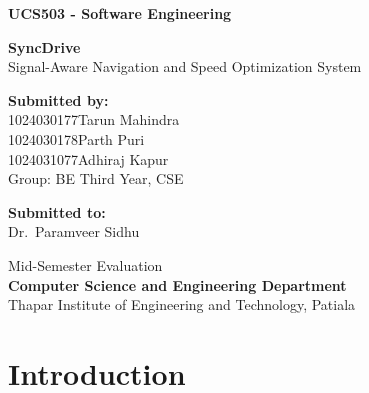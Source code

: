 \documentclass[12pt,a4paper]{report}
\begin{document}
\begin{titlepage}
\centering
\vspace*{2cm}

{\large\textbf{UCS503 - Software Engineering}}

\vspace{1.5cm}

{\Huge\textbf{SyncDrive}}\\[0.4cm]
{\large Signal-Aware Navigation and Speed Optimization System}

\vspace{3cm}

\textbf{Submitted by:}\\[0.3cm]
1024030177\quad Tarun Mahindra\\
1024030178\quad Parth Puri\\
1024031077\quad Adhiraj Kapur\\[0.4cm]
Group: BE Third Year, CSE

\vspace{2.5cm}

\textbf{Submitted to:}\\[0.3cm]
Dr.\ Paramveer Sidhu

\vspace{2.5cm}

Mid-Semester Evaluation\\[0.2cm]
\textbf{Computer Science and Engineering Department}\\
Thapar Institute of Engineering and Technology, Patiala

\end{titlepage}

\newpage\thispagestyle{empty}\mbox{}

\tableofcontents
\newpage

\chapter{Introduction}
\end{document}
